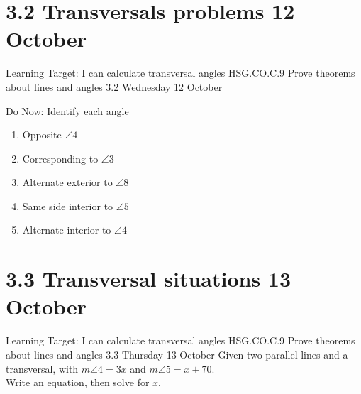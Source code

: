 \section{3.2 Transversals problems \hfill 12 October}
\begin{frame}{Learning Target: I can calculate transversal angles}
  {HSG.CO.C.9 Prove theorems about lines and angles  \hfill \alert{3.2 Wednesday 12 October}}
  \begin{block}{Do Now: Identify each angle}
    \begin{multicols}{2}
    \begin{enumerate}
      \item Opposite $\angle 4$
      \item Corresponding to $\angle 3$
      \item Alternate exterior to $\angle 8$
      \item Same side interior to $\angle 5$
      \item Alternate interior to $\angle 4$
  \end{enumerate}
  \begin{center}
  \end{center}
\end{multicols}
\end{block}
\end{frame}

\section{3.3 Transversal situations \hfill 13 October}
\begin{frame}{Learning Target: I can calculate transversal angles}
  {HSG.CO.C.9 Prove theorems about lines and angles  \hfill \alert{3.3 Thursday 13 October}}
  Given two parallel lines and a transversal, with $m\angle 4 = 3x$ and $m\angle 5 = x + 70$. \\ Write an equation, then solve for $x$.
  \begin{flushright}
  \end{flushright}
\end{frame}

